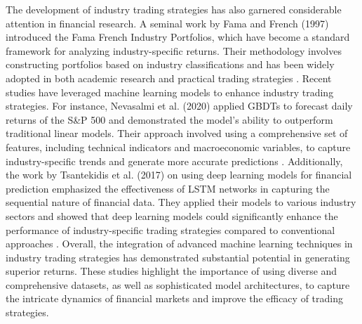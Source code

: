 \documentclass{article}
\begin{document}
The development of industry trading strategies has also garnered considerable attention in financial research. A seminal work by Fama and French (1997) introduced the Fama French Industry Portfolios, which have become a standard framework for analyzing industry-specific returns. Their methodology involves constructing portfolios based on industry classifications and has been widely adopted in both academic research and practical trading strategies \cite{french1997}. Recent studies have leveraged machine learning models to enhance industry trading strategies. For instance, Nevasalmi et al. (2020) applied GBDTs to forecast daily returns of the S\&P 500 and demonstrated the model's ability to outperform traditional linear models. Their approach involved using a comprehensive set of features, including technical indicators and macroeconomic variables, to capture industry-specific trends and generate more accurate predictions \cite{nevasalmi2020forecasting}. Additionally, the work by Tsantekidis et al. (2017) on using deep learning models for financial prediction emphasized the effectiveness of LSTM networks in capturing the sequential nature of financial data. They applied their models to various industry sectors and showed that deep learning models could significantly enhance the performance of industry-specific trading strategies compared to conventional approaches \cite{tsantekidis2017}. Overall, the integration of advanced machine learning techniques in industry trading strategies has demonstrated substantial potential in generating superior returns. These studies highlight the importance of using diverse and comprehensive datasets, as well as sophisticated model architectures, to capture the intricate dynamics of financial markets and improve the efficacy of trading strategies.


\end{document}
